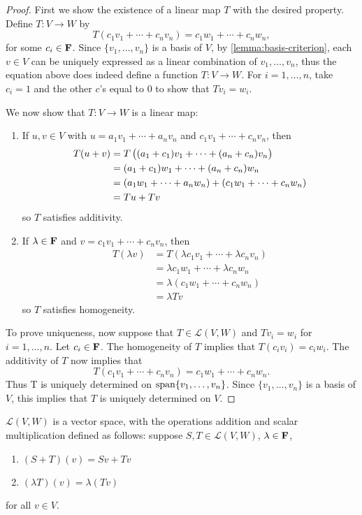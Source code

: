 \begin{proof}
First we show the existence of a linear map $T$ with the desired property. Define $T:V\to W$ by
\[T(c_1v_1+\cdots+c_nv_n)=c_1w_1+\cdots+c_nw_n,\]
for some $c_i\in\mathbf F$. Since $\{v_1,\dots,v_n\}$ is a basis of $V$, by \cref{lemma:basis-criterion}, each $v\in V$ can be uniquely expressed as a linear combination of $v_1,\dots,v_n$, thus the equation above does indeed define a function $T:V\to W$. For $i=1,\dots,n$, take $c_i=1$ and the other $c$'s equal to $0$ to show that $Tv_i=w_i$.

We now show that $T:V\to W$ is a linear map:
\begin{enumerate}[label=(\roman*)]
\item If $u,v\in V$ with $u=a_1v_1+\cdots+a_nv_n$ and $c_1v_1+\cdots+c_nv_n$, then
\begin{align*}
T(u+v)&=T\left((a_1+c_1)v_1+\cdots+(a_n+c_n)v_n\right)\\
&=(a_1+c_1)w_1+\cdots+(a_n+c_n)w_n\\
&=(a_1w_1+\cdots+a_nw_n)+(c_1w_1+\cdots+c_nw_n)\\
&=Tu+Tv
\end{align*}
so $T$ satisfies additivity.

\item If $\lambda\in\mathbf F$ and $v=c_1v_1+\cdots+c_nv_n$, then
\begin{align*}
T(\lambda v)&=T(\lambda c_1v_1+\cdots+\lambda c_nv_n)\\
&=\lambda c_1w_1+\cdots+\lambda c_nw_n\\
&=\lambda(c_1w_1+\cdots+c_nw_n)\\
&=\lambda Tv
\end{align*}
so $T$ satisfies homogeneity.
\end{enumerate}

To prove uniqueness, now suppose that $T\in\mathcal{L}(V,W)$ and $Tv_i=w_i$ for $i=1,\dots,n$. Let $c_i\in\mathbf F$. The homogeneity of $T$ implies that $T(c_iv_i)=c_iw_i$. The additivity of $T$ now implies that 
\[T(c_1v_1+\cdots+c_nv_n)=c_1w_1+\cdots+c_nw_n.\]
Thus T is uniquely determined on $\operatorname{span}\{v_1,\dots,v_n\}$. Since $\{v_1,\dots,v_n\}$ is a basis of $V$, this implies that $T$ is uniquely determined on $V$.
\end{proof}

\begin{proposition}
$\mathcal{L}(V,W)$ is a vector space, with the operations addition and scalar multiplication defined as follows: suppose $S,T\in\mathcal{L}(V,W)$, $\lambda\in\mathbf F$,
\begin{enumerate}[label=(\roman*)]
\item $(S+T)(v)=Sv+Tv$
\item $(\lambda T)(v)=\lambda(Tv)$
\end{enumerate}
for all $v\in V$.
\end{proposition}

